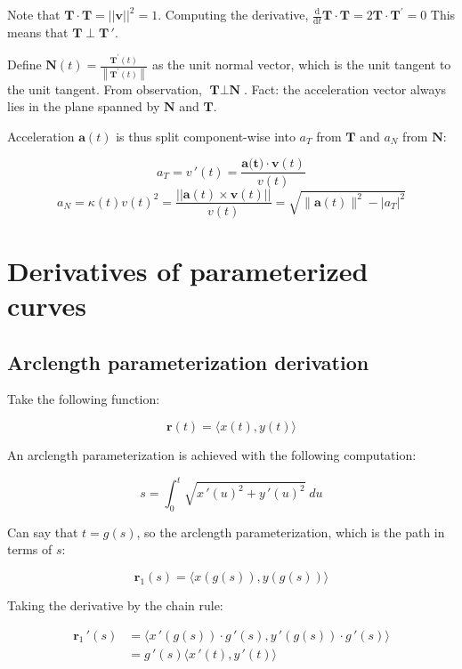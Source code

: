 Note that $\textbf{T}\cdot \textbf{T}=||\textbf{v}||^2=1$.
Computing the derivative, $\frac{\mathrm{d}}{\mathrm{d} t} \textbf{T} \cdot \textbf{T}=2 \textbf{T} \cdot \textbf{T}^{\prime}=0$
This means that $\textbf{T}\perp \textbf{T}\,'$.\newline

\noindent
Define $\boxed{\textbf{N}(t)=\frac{\textbf{T}^{\prime}(t)}{\left\|\textbf{T}^{\prime}(t)\right\|}}$ as
the unit normal vector, which is the unit tangent to the unit tangent. From observation, $\textbf{T}\perp \textbf{N}$.
Fact: the acceleration vector always lies in the plane spanned by $\textbf{N}$ and $\textbf{T}$.\newline

\noindent
Acceleration $\textbf{a}(t)$ is thus split component-wise into $a_T$ from $\textbf{T}$
and $a_N$ from $\textbf{N}$:

\[\boxed{a_T=v\,'(t)=\frac{\textbf{a(t)}\cdot \textbf{v}(t)}{v(t)}}\]
\[\boxed{a_N=\kappa(t)v(t)^2=\frac{||\textbf{a}(t)\times \textbf{v}(t)||}{v(t)}=\sqrt{\|\textbf{a}(t)\|^{2}-\left|a_{T}\right|^{2}}}\]

\section{Derivatives of parameterized curves}

\subsection{Arclength parameterization derivation}

Take the following function:

\[\textbf{r}(t)=\langle x(t),y(t) \rangle\]

An arclength parameterization is achieved with the following computation:

\[s=\int_0^t \sqrt{x\,'(u)^2+y\,'(u)^2}\;du\]

Can say that $t=g(s)$, so the arclength parameterization, which is the path in terms of $s$:

\[\textbf{r}_1(s)=\langle x(g(s)),y(g(s))\rangle\]

Taking the derivative by the chain rule:

\begin{align*}
    \textbf{r}_1\,'(s)&=\langle x\,'(g(s))\cdot g\,'(s),y\,'(g(s))\cdot g\,'(s)\rangle \\
    &=g\,'(s)\langle x\,'(t),y\,'(t) \rangle \\
\end{align*}

